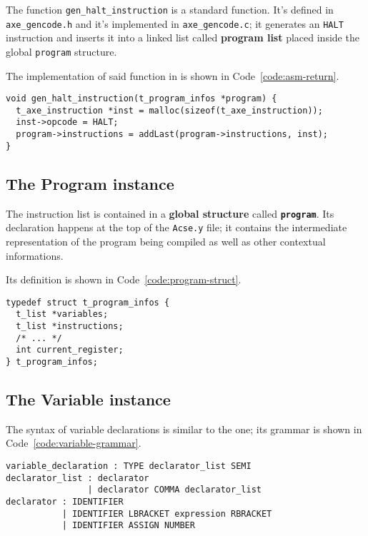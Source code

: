 The function \texttt{gen\_halt\_instruction} is a standard \clang function.
It's defined in \texttt{axe\_gencode.h} and it's implemented in \texttt{axe\_gencode.c};
it generates an \texttt{HALT} instruction and inserts it into a linked list called \textbf{program list} placed inside the global \texttt{program} structure.

The implementation of said function in \clang is shown in Code~\ref{code:asm-return}.

\begin{onepage}
  \begin{lstlisting}[language=LANCE, caption={\texttt{asm} return in \clang}, label={code:asm-return}]
void gen_halt_instruction(t_program_infos *program) {
  t_axe_instruction *inst = malloc(sizeof(t_axe_instruction));
  inst->opcode = HALT;
  program->instructions = addLast(program->instructions, inst);
}
\end{lstlisting}
\end{onepage}

\subsection{The Program instance}

The instruction list is contained in a \textbf{global structure} called \textbf{\texttt{program}}.
Its declaration happens at the top of the \texttt{Acse.y} file;
it contains the intermediate representation of the program being compiled as well as other contextual informations.

Its definition is shown in Code~\ref{code:program-struct}.

\begin{onepage}
  \begin{lstlisting}[language=LANCE, caption={\texttt{program} structure}, label={code:program-struct}]
typedef struct t_program_infos {
  t_list *variables;
  t_list *instructions;
  /* ... */
  int current_register;
} t_program_infos;
\end{lstlisting}
\end{onepage}

\subsection{The Variable instance}

The syntax of variable declarations is similar to the \clang one; its grammar is shown in Code~\ref{code:variable-grammar}.

\begin{onepage}
  \begin{lstlisting}[language=LANCE, caption={Variable grammar}, label={code:variable-grammar}]
variable_declaration : TYPE declarator_list SEMI
declarator_list : declarator
                | declarator COMMA declarator_list
declarator : IDENTIFIER
           | IDENTIFIER LBRACKET expression RBRACKET
           | IDENTIFIER ASSIGN NUMBER
\end{lstlisting}
\end{onepage}

